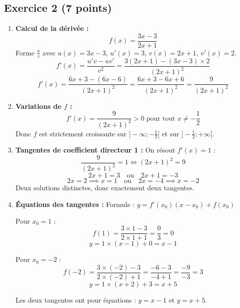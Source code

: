 \documentclass[a4paper,12pt]{article}
\begin{document}
\subsection*{Exercice 2 (7 points)}

\begin{enumerate}
\item \textbf{Calcul de la dérivée :}
\[
f(x) = \frac{3x - 3}{2x + 1}
\]
Forme \(\frac{u}{v}\) avec \(u(x) = 3x - 3\), \(u'(x) = 3\), \(v(x) = 2x + 1\), \(v'(x) = 2\).
\[
f'(x) = \frac{u'v - uv'}{v^2} = \frac{3(2x+1) - (3x-3) \times 2}{(2x+1)^2}
\]
\[
f'(x) = \frac{6x + 3 - (6x - 6)}{(2x+1)^2} = \frac{6x + 3 - 6x + 6}{(2x+1)^2} = \frac{9}{(2x+1)^2}
\]

\item \textbf{Variations de \(f\) :}
\[
f'(x) = \frac{9}{(2x+1)^2} > 0 \text{ pour tout } x \neq -\frac{1}{2}
\]
Donc \(f\) est strictement croissante sur \(]-\infty ; -\frac{1}{2}[\) et sur \(]-\frac{1}{2} ; +\infty[\).

\item \textbf{Tangentes de coefficient directeur 1 :}
On résout \(f'(x) = 1\) :
\[
\frac{9}{(2x+1)^2} = 1 \iff (2x+1)^2 = 9
\]
\[
2x+1 = 3 \quad \text{ou} \quad 2x+1 = -3
\]
\[
2x = 2 \implies x = 1 \quad \text{ou} \quad 2x = -4 \implies x = -2
\]
Deux solutions distinctes, donc exactement deux tangentes.

\item \textbf{Équations des tangentes :}
Formule : \(y = f'(x_0)(x - x_0) + f(x_0)\)

\noindent Pour \(x_0 = 1\) :
\[
f(1) = \frac{3 \times 1 - 3}{2 \times 1 + 1} = \frac{0}{3} = 0
\]
\[
y = 1 \times (x - 1) + 0 = x - 1
\]

\noindent Pour \(x_0 = -2\) :
\[
f(-2) = \frac{3 \times (-2) - 3}{2 \times (-2) + 1} = \frac{-6 - 3}{-4 + 1} = \frac{-9}{-3} = 3
\]
\[
y = 1 \times (x + 2) + 3 = x + 5
\]

Les deux tangentes ont pour équations : \(y = x - 1\) et \(y = x + 5\).

\end{enumerate}
\end{document}
